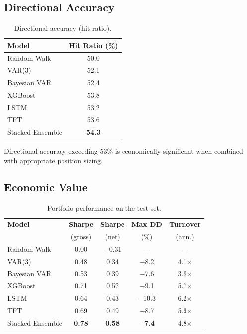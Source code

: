 \documentclass[11pt,a4paper,twocolumn]{article}
\begin{document}
\subsection{Directional Accuracy}

\begin{table}[H]
\centering
\caption{Directional accuracy (hit ratio).}
\label{tab:directional}
\small
\begin{tabular}{@{}lc@{}}
\toprule
\textbf{Model} & \textbf{Hit Ratio (\%)} \\
\midrule
Random Walk        & 50.0 \\
VAR(3)             & 52.1 \\
Bayesian VAR       & 52.4 \\
XGBoost            & 53.8 \\
LSTM               & 53.2 \\
TFT                & 53.6 \\
Stacked Ensemble   & \textbf{54.3} \\
\bottomrule
\end{tabular}
\end{table}

Directional accuracy exceeding 53\% is economically significant when combined
with appropriate position sizing.

\subsection{Economic Value}

\begin{table}[H]
\centering
\caption{Portfolio performance on the test set.}
\label{tab:economic}
\small
\begin{tabular}{@{}lcccc@{}}
\toprule
\textbf{Model} & \textbf{Sharpe} & \textbf{Sharpe} & \textbf{Max DD}
               & \textbf{Turnover} \\
               & (gross) & (net) & (\%) & (ann.) \\
\midrule
Random Walk      & 0.00 & $-$0.31 &  ---   & --- \\
VAR(3)           & 0.48 &    0.34 & $-$8.2 & 4.1$\times$ \\
Bayesian VAR     & 0.53 &    0.39 & $-$7.6 & 3.8$\times$ \\
XGBoost          & 0.71 &    0.52 & $-$9.1 & 5.7$\times$ \\
LSTM             & 0.64 &    0.43 & $-$10.3& 6.2$\times$ \\
TFT              & 0.69 &    0.49 & $-$8.7 & 5.9$\times$ \\
Stacked Ensemble & \textbf{0.78} & \textbf{0.58} & $-$\textbf{7.4}
                 & 4.8$\times$ \\
\bottomrule
\end{tabular}
\end{table}
\end{document}
